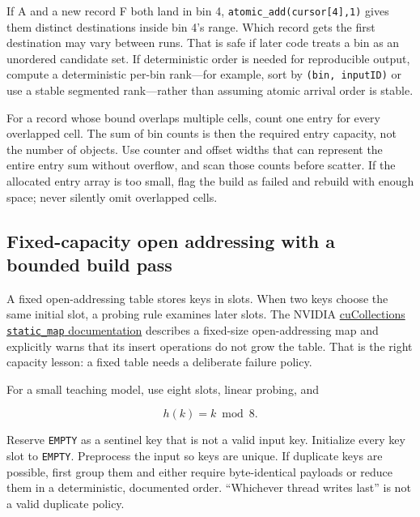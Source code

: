 If A and a new record F both land in bin 4, \texttt{atomic\_add(cursor{[}4{]},1)} gives them distinct destinations inside bin 4's range. Which record gets the first destination may vary between runs. That is safe if later code treats a bin as an unordered candidate set. If deterministic order is needed for reproducible output, compute a deterministic per-bin rank---for example, sort by \texttt{(bin,\ inputID)} or use a stable segmented rank---rather than assuming atomic arrival order is stable.

For a record whose bound overlaps multiple cells, count one entry for every overlapped cell. The sum of bin counts is then the required entry capacity, not the number of objects. Use counter and offset widths that can represent the entire entry sum without overflow, and scan those counts before scatter. If the allocated entry array is too small, flag the build as failed and rebuild with enough space; never silently omit overlapped cells.

\subsection{Fixed-capacity open addressing with a bounded build pass}\label{03-visual-computing-i-ch016-fixed-capacity-open-addressing-with-a-bounded-build-pass}

\hypertarget{03-visual-computing-i-ch016-fixed-capacity-open-addressing-with-a-bounded-build-pass}{}

A fixed open-addressing table stores keys in slots. When two keys choose the same initial slot, a probing rule examines later slots. The NVIDIA \href{https://github.com/NVIDIA/cuCollections/blob/dev/include/cuco/static_map.cuh}{cuCollections \texttt{static\_map} documentation} describes a fixed-size open-addressing map and explicitly warns that its insert operations do not grow the table. That is the right capacity lesson: a fixed table needs a deliberate failure policy.

For a small teaching model, use eight slots, linear probing, and

\[
h(k)=k\bmod8.
\]

Reserve \texttt{EMPTY} as a sentinel key that is not a valid input key. Initialize every key slot to \texttt{EMPTY}. Preprocess the input so keys are unique. If duplicate keys are possible, first group them and either require byte-identical payloads or reduce them in a deterministic, documented order. ``Whichever thread writes last'' is not a valid duplicate policy.

